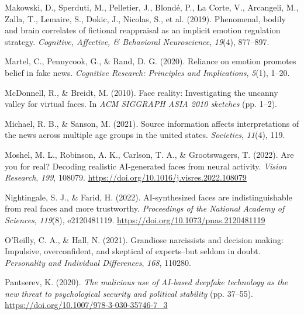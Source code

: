 \documentclass[
  man,floatsintext]{apa6}
\newlength{\cslhangindent}
\newlength{\cslentryspacingunit} %
\newenvironment{CSLReferences}[2] %
 {%
  \setlength{\parindent}{0pt}
  \ifodd #1
  \let\oldpar\par
  \def\par{\hangindent=\cslhangindent\oldpar}
  \fi
  \setlength{\parskip}{#2\cslentryspacingunit}
 }%
 {}
\begin{document}
\begin{CSLReferences}{1}{0}
\leavevmode{}%
Makowski, D., Sperduti, M., Pelletier, J., Blondé, P., La Corte, V., Arcangeli, M., Zalla, T., Lemaire, S., Dokic, J., Nicolas, S., et al. (2019). Phenomenal, bodily and brain correlates of fictional reappraisal as an implicit emotion regulation strategy. \emph{Cognitive, Affective, \& Behavioral Neuroscience}, \emph{19}(4), 877--897.

\leavevmode{}%
Martel, C., Pennycook, G., \& Rand, D. G. (2020). Reliance on emotion promotes belief in fake news. \emph{Cognitive Research: Principles and Implications}, \emph{5}(1), 1--20.

\leavevmode{}%
McDonnell, R., \& Breidt, M. (2010). Face reality: Investigating the uncanny valley for virtual faces. In \emph{ACM SIGGRAPH ASIA 2010 sketches} (pp. 1--2).

\leavevmode{}%
Michael, R. B., \& Sanson, M. (2021). Source information affects interpretations of the news across multiple age groups in the united states. \emph{Societies}, \emph{11}(4), 119.

\leavevmode{}%
Moshel, M. L., Robinson, A. K., Carlson, T. A., \& Grootswagers, T. (2022). Are you for real? Decoding realistic AI-generated faces from neural activity. \emph{Vision Research}, \emph{199}, 108079. \url{https://doi.org/10.1016/j.visres.2022.108079}

\leavevmode{}%
Nightingale, S. J., \& Farid, H. (2022). AI-synthesized faces are indistinguishable from real faces and more trustworthy. \emph{Proceedings of the National Academy of Sciences}, \emph{119}(8), e2120481119. \url{https://doi.org/10.1073/pnas.2120481119}

\leavevmode{}%
O'Reilly, C. A., \& Hall, N. (2021). Grandiose narcissists and decision making: Impulsive, overconfident, and skeptical of experts--but seldom in doubt. \emph{Personality and Individual Differences}, \emph{168}, 110280.

\leavevmode{}%
Pantserev, K. (2020). \emph{The malicious use of AI-based deepfake technology as the new threat to psychological security and political stability} (pp. 37--55). \url{https://doi.org/10.1007/978-3-030-35746-7_3}


\end{CSLReferences}
\end{document}
